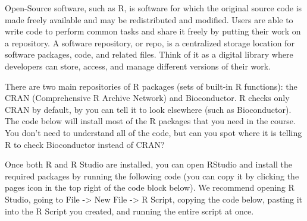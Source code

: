 \documentclass[
]{book}
\begin{document}
Open-Source software, such as R, is software for which the original source code is made freely available and may be redistributed and modified. Users are able to write code to perform common tasks and share it freely by putting their work on a repository. A software repository, or repo, is a centralized storage location for software packages, code, and related files. Think of it as a digital library where developers can store, access, and manage different versions of their work.

There are two main repositories of R packages (sets of built-in R functions): the CRAN (Comprehensive R Archive Network) and Bioconductor. R checks only CRAN by default, by you can tell it to look elsewhere (such as Bioconductor). The code below will install most of the R packages that you need in the course. You don't need to understand all of the code, but can you spot where it is telling R to check Bioconductor instead of CRAN?

Once both R and R Studio are installed, you can open RStudio and install the required packages by running the following code (you can copy it by clicking the pages icon in the top right of the code block below). We recommend opening R Studio, going to File -\textgreater{} New File -\textgreater{} R Script, copying the code below, pasting it into the R Script you created, and running the entire script at once.
\end{document}

